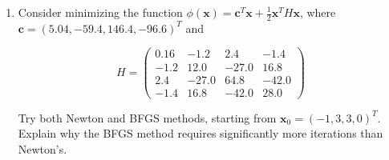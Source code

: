\documentclass[12pt]{article}
\newcommand{\vect}{\mathbf}
\newcommand{\inv}[1]{ #1^{-1}}
\begin{document}
\begin{enumerate}
\begin{enumerate}
  The equation for Newton's Method is
  \begin{align*}
    J[\vect{x}]p_{k} &= -f(\vect{x})\\
    \intertext{So we have to calculate the Jacobian of $f(x) = A\vect{x} - \vect{b}$, which is $J[\vect{x}] = A$, giving}
    Ap_{k} &= -f(\vect{x})\\
    \intertext{with a given $\vect{x}_{0}$ of an initial guess, it gives}
    Ap_{0} &= -\left( A\vect{x}_{0} - \vect{b}\right)\\
    \intertext{Where we can multiply by the interverse of $A$, giving}
    p_{0} &= -\vect{x}_{0} + \inv{A}\vect{b}
    \intertext{where we can finally show that it will require only one iteration for convergence}
    \vect{x}_{1} &= \vect{x}_{0} + p_{0} = \vect{x}_{0} + \left( -\vect{x}_{0} + \inv{A}\vect{b}\right) = \inv{A}\vect{b}
  \end{align*}

  \item Suppose the Jacobian matrix is singular at the solution of a nonlinear system
  of equations. Speculate what can occur in terms of convergence and the rate of convergence.
  Specifically, is it possible to have a situation where the newton iteration converges but
  convergence is not quadratic?

  {\bf Solution:}

  The text states that the Jacobian matrix should have a bounded inverse and also
  a continuous derivative to guarentee that Newton's Method can converge quadratically.
  However, the question states that the Jacobian is singular, so it won't converge
  quadratically.

\end{enumerate}

\item Consider minimizing the function $\phi(\vect{x}) = \vect{c}^{T}\vect{x} + \frac{1}{2}\vect{x}^{T}H\vect{x}$,
where $\vect{c} = \left( 5.04,-59.4,146.4,-96.6\right)^{T}$ and

\[
  H = \begin{pmatrix}0.16 & -1.2 & 2.4 & -1.4 \\
                     -1.2 & 12.0 & -27.0 & 16.8\\
                     2.4  & -27.0 & 64.8 & -42.0\\
                     -1.4 & 16.8 & -42.0 & 28.0\end{pmatrix}
\]

Try both Newton and BFGS methods, starting from $\vect{x}_{0} = \left( -1,3,3,0\right)^{T}$.
Explain why the BFGS method requires significantly more iterations than Newton's.


\end{enumerate}
\end{document}
